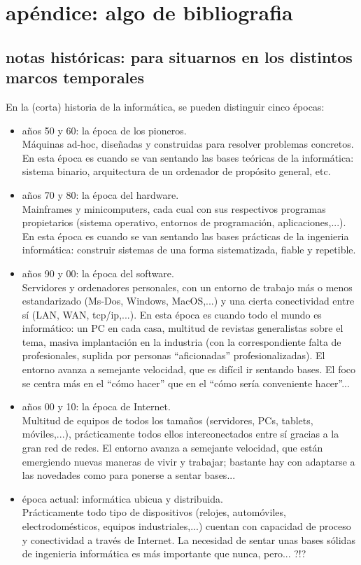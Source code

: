 \documentclass[spanish,12pt,a4paper,final,oneside]{book}
\begin{document}
\chapter{apéndice: algo de bibliografia}

\section{notas históricas: para situarnos en los distintos marcos temporales}
En la (corta) historia de la informática, se pueden distinguir cinco épocas:
\begin{itemize}
\item años 50 y 60: la época de los pioneros. 
\\Máquinas ad-hoc, diseñadas y construidas para resolver problemas concretos. En esta época es cuando se van sentando las bases teóricas de la informática: sistema binario, arquitectura de un ordenador de propósito general, etc.
\item años 70 y 80: la época del hardware. 
\\Mainframes y minicomputers, cada cual con sus respectivos programas propietarios (sistema operativo, entornos de programación, aplicaciones,...). En esta época es cuando se van sentando las bases prácticas de la ingenieria informática: construir sistemas de una forma sistematizada, fiable y repetible.
\item años 90 y 00: la época del software. 
\\Servidores y ordenadores personales, con un entorno de trabajo más o menos estandarizado (Ms-Dos, Windows, MacOS,...) y una cierta conectividad entre sí (LAN, WAN, tcp/ip,...). En esta época es cuando todo el mundo es informático: un PC en cada casa, multitud de revistas generalistas sobre el tema, masiva implantación en la industria (con la correspondiente falta de profesionales, suplida por personas ``aficionadas'' profesionalizadas). El entorno avanza a semejante velocidad, que es difícil ir sentando bases. El foco se centra más en el ``cómo hacer'' que en el ``cómo sería conveniente hacer''...
\item años 00 y 10: la época de Internet. 
\\Multitud de equipos de todos los tamaños (servidores, PCs, tablets, móviles,...), prácticamente todos ellos interconectados entre sí gracias a la gran red de redes. El entorno avanza a semejante velocidad, que están emergiendo nuevas maneras de vivir y trabajar; bastante hay con adaptarse a las novedades como para ponerse a sentar bases...
\item época actual: informática ubicua y distribuida. 
\\Prácticamente todo tipo de dispositivos (relojes, automóviles, electrodomésticos, equipos industriales,...) cuentan con capacidad de proceso y conectividad a través de Internet. La necesidad de sentar unas bases sólidas de ingenieria informática es más importante que nunca, pero... ?!?
\end{itemize}
\end{document}
